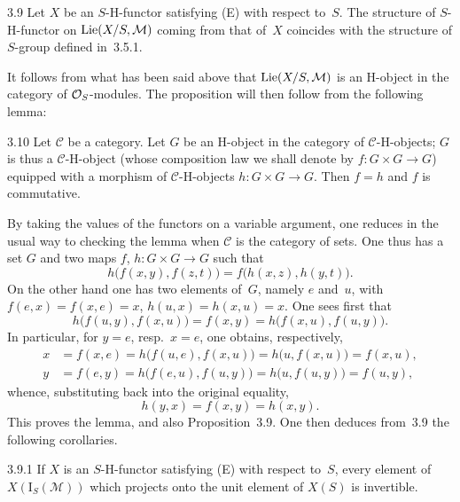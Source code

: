 \begin{proposition}{3.9}\label{II.3.9}
Let \(X\) be an \(S\)-H-functor satisfying \textup{(E)} with respect to~\(S\).
The structure of \(S\)-H-functor on \(\operatorname{Lie}(X/S,\mathcal{M})\) coming from that
of~\(X\) coincides with the structure of \(S\)-group defined in~3.5.1.
\end{proposition}

It follows from what has been said above that \(\operatorname{Lie}(X/S,\mathcal{M})\) is an
H-object in the category of \(\mathcal{O}_S\)-modules. The proposition will then follow
from the following lemma:%
{\renewcommand{\thefootnote}{(33)}}

\begin{lemma}{3.10}\label{II.3.10}
Let \(\mathcal{C}\) be a category. Let \(G\) be an H-object in the category of
\(\mathcal{C}\)-H-objects; \(G\) is thus a \(\mathcal{C}\)-H-object (whose
composition law we shall denote by \(f\colon G\times G\to G\)) equipped with
a morphism of \(\mathcal{C}\)-H-objects \(h\colon G\times G\to G\).%
{\renewcommand{\thefootnote}{(34)}}
Then \(f=h\) and \(f\) is commutative.
\end{lemma}

By taking the values of the functors on a variable argument, one reduces in
the usual way to checking the lemma when \(\mathcal{C}\) is the category of
sets. One thus has a set \(G\) and two maps \(f\), \(h\colon G\times G\to G\)
such that
\[
h\bigl(f(x,y),f(z,t)\bigr)=f\bigl(h(x,z),h(y,t)\bigr).
\]
On the other hand one has two elements of~\(G\), namely \(e\) and~\(u\), with
\(f(e,x)=f(x,e)=x\), \(h(u,x)=h(x,u)=x\). One sees first that
\[
h\bigl(f(u,y),f(x,u)\bigr)=f(x,y)=h\bigl(f(x,u),f(u,y)\bigr).
\]
In particular, for \(y=e\), resp.\ \(x=e\), one obtains, respectively,
\begin{align*}
x&=f(x,e)=h\bigl(f(u,e),f(x,u)\bigr)=h\bigl(u,f(x,u)\bigr)=f(x,u),\\
y&=f(e,y)=h\bigl(f(e,u),f(u,y)\bigr)=h\bigl(u,f(u,y)\bigr)=f(u,y),
\end{align*}
whence, substituting back into the original equality,
\[
h(y,x)=f(x,y)=h(x,y).
\]
This proves the lemma, and also Proposition~3.9. One then deduces from~3.9
the following corollaries.

\begin{corollary}{3.9.1}\label{II.3.9.1}
If \(X\) is an \(S\)-H-functor satisfying \textup{(E)} with respect to~\(S\),
every element of \(X(\mathrm{I}_{S}(\mathcal{M}))\) which projects onto the
unit element of \(X(S)\) is invertible.
\end{corollary}

